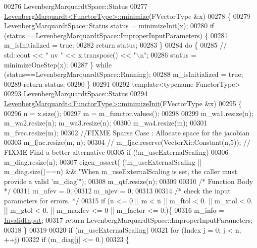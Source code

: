 \begin{DoxyCode}
00276 LevenbergMarquardtSpace::Status
00277 \hyperlink{class_eigen_1_1_levenberg_marquardt}{LevenbergMarquardt<FunctorType>::minimize}(FVectorType  &x)
00278 \{
00279     LevenbergMarquardtSpace::Status status = minimizeInit(x);
00280     \textcolor{keywordflow}{if} (status==LevenbergMarquardtSpace::ImproperInputParameters) \{
00281       m\_isInitialized = \textcolor{keyword}{true};
00282       \textcolor{keywordflow}{return} status;
00283     \}
00284     \textcolor{keywordflow}{do} \{
00285 \textcolor{comment}{//       std::cout << " uv " << x.transpose() << "\(\backslash\)n";}
00286         status = minimizeOneStep(x);
00287     \} \textcolor{keywordflow}{while} (status==LevenbergMarquardtSpace::Running);
00288      m\_isInitialized = \textcolor{keyword}{true};
00289      \textcolor{keywordflow}{return} status;
00290 \}
00291 
00292 \textcolor{keyword}{template}<\textcolor{keyword}{typename} FunctorType>
00293 LevenbergMarquardtSpace::Status
00294 \hyperlink{class_eigen_1_1_levenberg_marquardt}{LevenbergMarquardt<FunctorType>::minimizeInit}(FVectorType  &x)
00295 \{
00296     n = x.size();
00297     m = m\_functor.values();
00298 
00299     m\_wa1.resize(n); m\_wa2.resize(n); m\_wa3.resize(n);
00300     m\_wa4.resize(m);
00301     m\_fvec.resize(m);
00302     \textcolor{comment}{//FIXME Sparse Case : Allocate space for the jacobian}
00303     m\_fjac.resize(m, n);
00304 \textcolor{comment}{//     m\_fjac.reserve(VectorXi::Constant(n,5)); // FIXME Find a better alternative}
00305     \textcolor{keywordflow}{if} (!m\_useExternalScaling)
00306         m\_diag.resize(n);
00307     eigen\_assert( (!m\_useExternalScaling || m\_diag.size()==n) && \textcolor{stringliteral}{"When m\_useExternalScaling is set, the
       caller must provide a valid 'm\_diag'"});
00308     m\_qtf.resize(n);
00309 
00310     \textcolor{comment}{/* Function Body */}
00311     m\_nfev = 0;
00312     m\_njev = 0;
00313 
00314     \textcolor{comment}{/*     check the input parameters for errors. */}
00315     \textcolor{keywordflow}{if} (n <= 0 || m < n || m\_ftol < 0. || m\_xtol < 0. || m\_gtol < 0. || m\_maxfev <= 0 || m\_factor <= 0.)\{
00316       m\_info = \hyperlink{group__enums_gga85fad7b87587764e5cf6b513a9e0ee5ea945604f62795ffc70aedf2bd12ea0434}{InvalidInput};
00317       \textcolor{keywordflow}{return} LevenbergMarquardtSpace::ImproperInputParameters;
00318     \}
00319 
00320     \textcolor{keywordflow}{if} (m\_useExternalScaling)
00321         \textcolor{keywordflow}{for} (Index j = 0; j < n; ++j)
00322             \textcolor{keywordflow}{if} (m\_diag[j] <= 0.) 
00323             \{

\end{DoxyCode}
